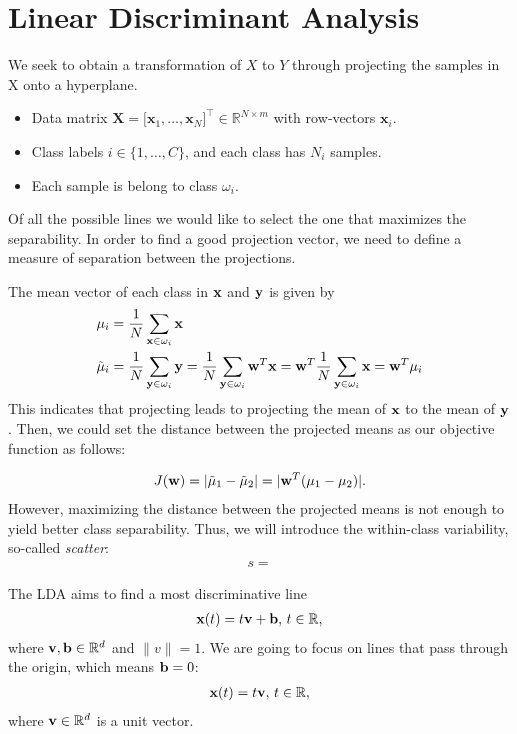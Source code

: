 \section{Linear Discriminant Analysis}

We seek to obtain a transformation of $X$ to $Y$ through projecting the samples in X onto a hyperplane.
\begin{itemize}
  \item Data matrix $\mathbf X=\bigl[\mathbf x_1,\dots,\mathbf x_N\bigr]^\top\in\mathbb R^{N\times m}$ with row‑vectors $\mathbf x_i$.
  \item Class labels $i\in\{1,\dots,C\}$, and each class has $N_i$ samples. 
  \item Each sample is belong to class $\omega_i$.
\end{itemize}
Of all the possible lines we would like to select the one that maximizes the separability. In order to find a good projection vector, we need to define a measure of separation between the projections.

The mean vector of each class in ${\mathbf{x}}$ and ${\mathbf{y}}$ is given by
\begin{align*}
	\mu_i &= \frac{1}{N}\sum_{{\mathbf{x}}\in \omega_i} {\mathbf{x}}\\
	\tilde{\mu}_i &= \frac{1}{N}\sum_{{\mathbf{y}}\in \omega_i} {\mathbf{y}} = \frac{1}{N}\sum_{{\mathbf{y}}\in \omega_i} {\mathbf{w}}^T{\mathbf{x}} = {\mathbf{w}}^T\frac{1}{N}\sum_{{\mathbf{y}}\in \omega_i} {\mathbf{x}} = {\mathbf{w}}^T\mu_i
\end{align*}
This indicates that projecting leads to projecting the mean of ${\mathbf{x}}$ to the mean of ${\mathbf{y}}$. Then, we could set the distance between the projected means as our objective function as follows:

\begin{align*}
	J({\mathbf{w}}) = |\tilde{\mu}_1 - \tilde{\mu}_2| = |{\mathbf{w}}^T(\mu_1 - \mu_2)|.
\end{align*}
However, maximizing the distance between the projected means is not enough to yield better class separability. Thus, we will introduce the within-class variability, so-called \textit{scatter}:
\begin{align*}
	s = 
\end{align*}



The LDA aims to find a most discriminative line
\begin{align*}
	{\mathbf{x}}(t) = t{\mathbf{v}} + {\mathbf{b}}, \, t\in \mathbb{R}, 
\end{align*}
where ${\mathbf{v}}, {\mathbf{b}} \in \mathbb{R}^d$ and $\|v\|=1$. We are going to focus on lines that pass through the origin, which means ${\mathbf{b}}=0$:
\begin{align*}
	{\mathbf{x}}(t) = t{\mathbf{v}}, \, t\in \mathbb{R}, 
\end{align*}
where ${\mathbf{v}} \in \mathbb{R}^d$ is a unit vector. 

